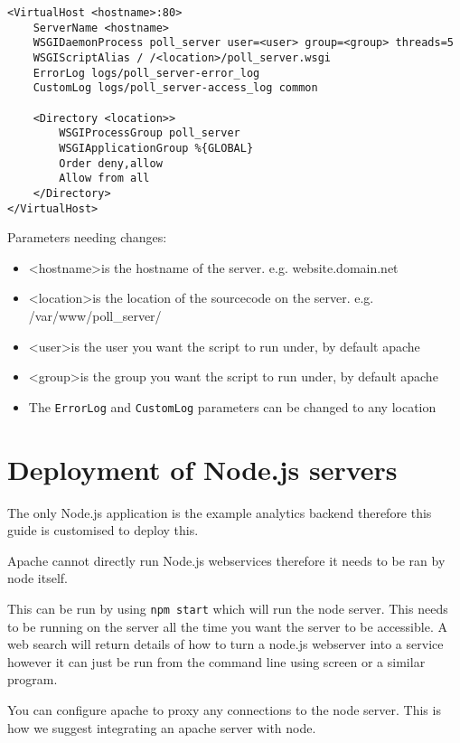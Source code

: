 \begin{lstlisting}[caption={Apache configuration}, label={code:apacheConfig_flask}]
<VirtualHost <hostname>:80>
	ServerName <hostname>
	WSGIDaemonProcess poll_server user=<user> group=<group> threads=5
	WSGIScriptAlias / /<location>/poll_server.wsgi
	ErrorLog logs/poll_server-error_log
	CustomLog logs/poll_server-access_log common

	<Directory <location>>
		WSGIProcessGroup poll_server
		WSGIApplicationGroup %{GLOBAL}
		Order deny,allow
		Allow from all
	</Directory>
</VirtualHost>
\end{lstlisting}

Parameters needing changes:

\begin{itemize}
\item \textless hostname\textgreater is the hostname of the server. e.g. website.domain.net
\item \textless location\textgreater is the location of the sourcecode on the server. e.g. /var/www/poll\_server/
\item \textless user\textgreater is the user you want the script to run under, by default apache
\item \textless group\textgreater is the group you want the script to run under, by default apache
\item The \lstinline|ErrorLog| and \lstinline|CustomLog| parameters can be changed to any location

\end{itemize}

\section{Deployment of Node.js servers} \label{Section:Deployment of Node.js servers}

The only Node.js application is the example analytics backend therefore this guide is customised to deploy this.

Apache cannot directly run Node.js webservices therefore it needs to be ran by node itself.

This can be run by using \lstinline|npm start| which will run the node server. This needs to be running on the server all the time you want the server to be accessible.
A web search will return details of how to turn a node.js webserver into a service however it can just be run from the command line using screen or a similar program.

You can configure apache to proxy any connections to the node server. This is how we suggest integrating an apache server with node.

